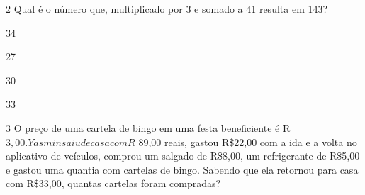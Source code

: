 

\num{2} Qual é o número que, multiplicado por 3 e somado a 41 resulta em 143?

\begin{escolha}
\item 34
\item 27
\item 30
\item 33
\end{escolha}



\num{3} O preço de uma cartela de bingo em uma festa beneficiente é
R\(3,00. Yasmin saiu de casa com R\) 89,00 reais, gastou R\$22,00 com a
ida e a volta no aplicativo de veículos, comprou um salgado de R\$8,00,
um refrigerante de R\$5,00 e gastou uma quantia com cartelas de bingo.
Sabendo que ela retornou para casa com R\$33,00, quantas cartelas foram
compradas?

